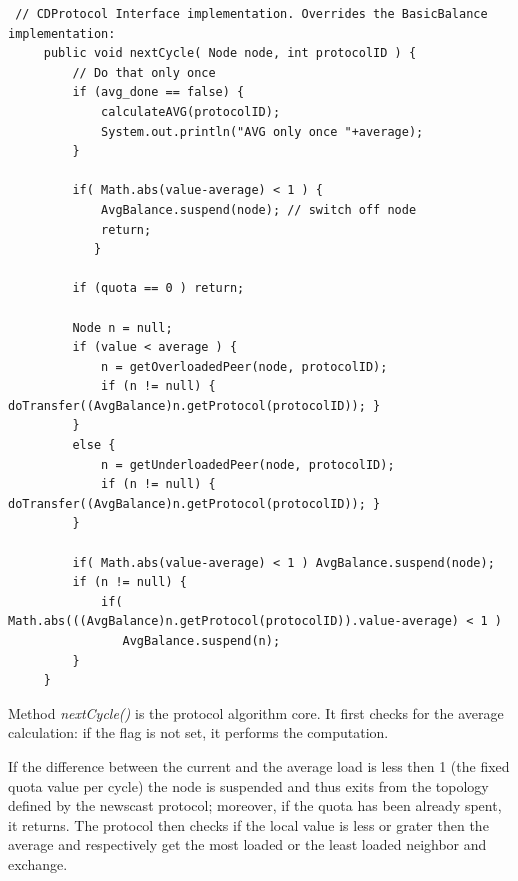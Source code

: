 \documentclass[a4paper,11pt]{article}
\begin{document}
\footnotesize
\begin{verbatim}
 // CDProtocol Interface implementation. Overrides the BasicBalance implementation:
     public void nextCycle( Node node, int protocolID ) {
         // Do that only once
         if (avg_done == false) {
             calculateAVG(protocolID);
             System.out.println("AVG only once "+average);
         }
    
         if( Math.abs(value-average) < 1 ) {
             AvgBalance.suspend(node); // switch off node
             return;
            }
     
         if (quota == 0 ) return;
     
         Node n = null;
         if (value < average ) {
             n = getOverloadedPeer(node, protocolID);
             if (n != null) { doTransfer((AvgBalance)n.getProtocol(protocolID)); } 
         }
         else {
             n = getUnderloadedPeer(node, protocolID);
             if (n != null) { doTransfer((AvgBalance)n.getProtocol(protocolID)); } 
         } 
     
         if( Math.abs(value-average) < 1 ) AvgBalance.suspend(node);
         if (n != null) {
             if( Math.abs(((AvgBalance)n.getProtocol(protocolID)).value-average) < 1 ) 
	            AvgBalance.suspend(n);
         }
     }
\end{verbatim}
\normalsize

Method \emph{nextCycle()} is the protocol algorithm core. It first
checks for the average calculation: if the flag is not set, it performs
the computation.

If the difference between the current and the average load is less
then 1 (the fixed quota value per cycle) the node is suspended and
thus exits from the topology defined by the newscast protocol; moreover,
if the quota has been already spent, it returns. The protocol then
checks if the local value is less or grater then the average and respectively
get the most loaded or the least loaded neighbor and exchange.
\end{document}
